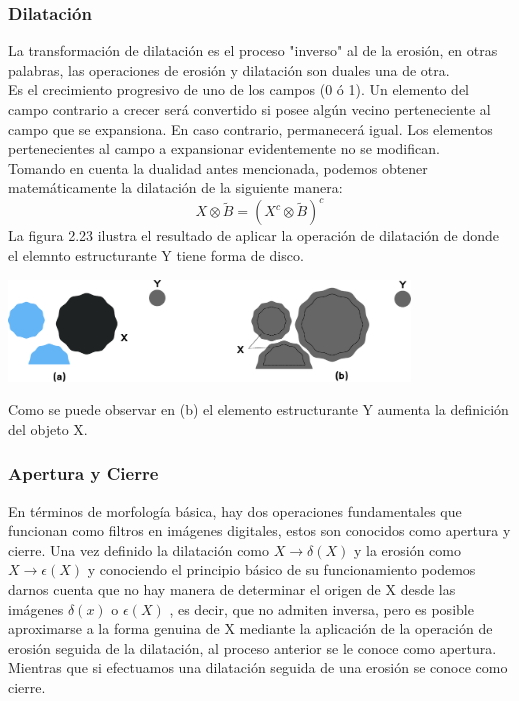 \subsubsection{Dilatación}
La transformación de dilatación es el proceso "inverso" al de la erosión, en otras palabras, las operaciones de erosión y dilatación son duales una de otra.\\
Es el crecimiento progresivo de uno de los campos (0 ó 1). Un elemento del
campo contrario a crecer será convertido si posee algún vecino perteneciente al campo
que se expansiona. En caso contrario, permanecerá igual. Los elementos pertenecientes
al campo a expansionar evidentemente no se modifican.\cite{Book:Jose2005}\\
Tomando en cuenta la dualidad antes mencionada, podemos obtener matemáticamente la dilatación de la siguiente manera:
\begin{equation}
	X \otimes \tilde{B} = (X^c \otimes \tilde{B})^c
\end{equation}
La figura 2.23 ilustra el resultado de aplicar la operación de dilatación de donde el elemnto estructurante Y tiene forma de disco.
\begin{center}
	\includegraphics[width=0.8\textwidth]{Contenido/Cuerpo/Capitulo2/Fig15.eps}
	\label{fig:MarcoTeorico:Fig23}
\end{center}
Como se puede observar en (b) el elemento estructurante Y aumenta la definición del objeto X.

\subsubsection{Apertura y Cierre}
En términos de morfología básica, hay dos operaciones fundamentales que funcionan como filtros en imágenes digitales, estos son conocidos como apertura
y cierre. Una vez definido la dilatación como $X \rightarrow \delta(X)$ y la erosión como $X \rightarrow \epsilon(X)$ y conociendo el principio
básico de su funcionamiento podemos darnos cuenta que no hay manera de determinar el origen de X desde las imágenes $\delta(x)$ o $\epsilon(X)$
, es decir, que no admiten inversa, pero es posible aproximarse a la forma genuina de X mediante la aplicación de la operación de erosión
seguida de la dilatación, al proceso anterior se le conoce como apertura. Mientras que si efectuamos una dilatación seguida de una erosión se conoce
como cierre.

